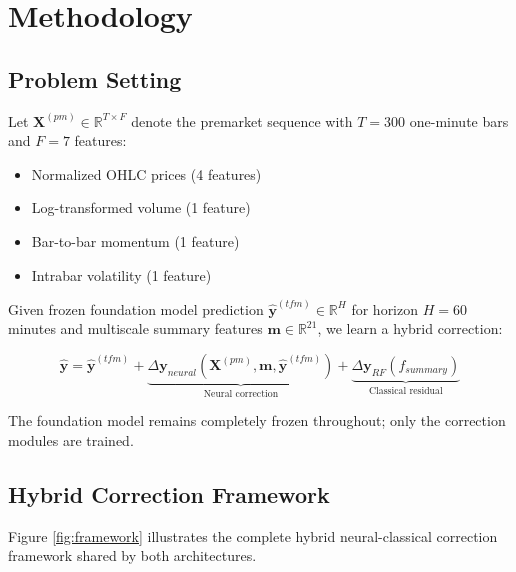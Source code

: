 \documentclass[10pt,conference]{IEEEtran}
\begin{document}
\section{Methodology}

\subsection{Problem Setting}

Let $\mathbf{X}^{(pm)} \in \mathbb{R}^{T \times F}$ denote the premarket sequence with $T = 300$ one-minute bars and $F = 7$ features:
\begin{itemize}
    \item Normalized OHLC prices (4 features)
    \item Log-transformed volume (1 feature)
    \item Bar-to-bar momentum (1 feature)
    \item Intrabar volatility (1 feature)
\end{itemize}

Given frozen foundation model prediction $\hat{\mathbf{y}}^{(tfm)} \in \mathbb{R}^{H}$ for horizon $H = 60$ minutes and multiscale summary features $\mathbf{m} \in \mathbb{R}^{21}$, we learn a hybrid correction:

\begin{equation}
    \hat{\mathbf{y}} = \hat{\mathbf{y}}^{(tfm)} + \underbrace{\Delta\mathbf{y}_{neural}(\mathbf{X}^{(pm)}, \mathbf{m}, \hat{\mathbf{y}}^{(tfm)})}_{\text{Neural correction}} + \underbrace{\Delta\mathbf{y}_{RF}(f_{summary})}_{\text{Classical residual}}
\end{equation}

The foundation model remains completely frozen throughout; only the correction modules are trained.

\subsection{Hybrid Correction Framework}

Figure \ref{fig:framework} illustrates the complete hybrid neural-classical correction framework shared by both architectures.
\end{document}
